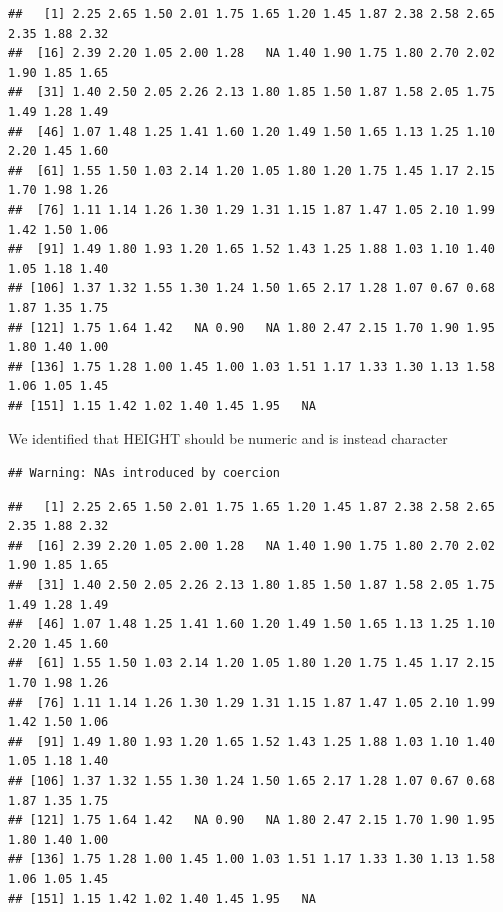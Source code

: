 \documentclass[
]{article}
\newenvironment{Shaded}{\begin{snugshade}}{\end{snugshade}}
\newcommand{\FunctionTok}[1]{\textcolor[rgb]{0.00,0.00,0.00}{#1}}
\newcommand{\NormalTok}[1]{#1}
\newcommand{\OtherTok}[1]{\textcolor[rgb]{0.56,0.35,0.01}{#1}}
\newcommand{\SpecialCharTok}[1]{\textcolor[rgb]{0.00,0.00,0.00}{#1}}
\begin{document}
\begin{verbatim}
##   [1] 2.25 2.65 1.50 2.01 1.75 1.65 1.20 1.45 1.87 2.38 2.58 2.65 2.35 1.88 2.32
##  [16] 2.39 2.20 1.05 2.00 1.28   NA 1.40 1.90 1.75 1.80 2.70 2.02 1.90 1.85 1.65
##  [31] 1.40 2.50 2.05 2.26 2.13 1.80 1.85 1.50 1.87 1.58 2.05 1.75 1.49 1.28 1.49
##  [46] 1.07 1.48 1.25 1.41 1.60 1.20 1.49 1.50 1.65 1.13 1.25 1.10 2.20 1.45 1.60
##  [61] 1.55 1.50 1.03 2.14 1.20 1.05 1.80 1.20 1.75 1.45 1.17 2.15 1.70 1.98 1.26
##  [76] 1.11 1.14 1.26 1.30 1.29 1.31 1.15 1.87 1.47 1.05 2.10 1.99 1.42 1.50 1.06
##  [91] 1.49 1.80 1.93 1.20 1.65 1.52 1.43 1.25 1.88 1.03 1.10 1.40 1.05 1.18 1.40
## [106] 1.37 1.32 1.55 1.30 1.24 1.50 1.65 2.17 1.28 1.07 0.67 0.68 1.87 1.35 1.75
## [121] 1.75 1.64 1.42   NA 0.90   NA 1.80 2.47 2.15 1.70 1.90 1.95 1.80 1.40 1.00
## [136] 1.75 1.28 1.00 1.45 1.00 1.03 1.51 1.17 1.33 1.30 1.13 1.58 1.06 1.05 1.45
## [151] 1.15 1.42 1.02 1.40 1.45 1.95   NA
\end{verbatim}

We identified that HEIGHT should be numeric and is instead character

\begin{Shaded}
\end{Shaded}

\begin{verbatim}
## Warning: NAs introduced by coercion
\end{verbatim}

\begin{Shaded}
\end{Shaded}

\begin{verbatim}
##   [1] 2.25 2.65 1.50 2.01 1.75 1.65 1.20 1.45 1.87 2.38 2.58 2.65 2.35 1.88 2.32
##  [16] 2.39 2.20 1.05 2.00 1.28   NA 1.40 1.90 1.75 1.80 2.70 2.02 1.90 1.85 1.65
##  [31] 1.40 2.50 2.05 2.26 2.13 1.80 1.85 1.50 1.87 1.58 2.05 1.75 1.49 1.28 1.49
##  [46] 1.07 1.48 1.25 1.41 1.60 1.20 1.49 1.50 1.65 1.13 1.25 1.10 2.20 1.45 1.60
##  [61] 1.55 1.50 1.03 2.14 1.20 1.05 1.80 1.20 1.75 1.45 1.17 2.15 1.70 1.98 1.26
##  [76] 1.11 1.14 1.26 1.30 1.29 1.31 1.15 1.87 1.47 1.05 2.10 1.99 1.42 1.50 1.06
##  [91] 1.49 1.80 1.93 1.20 1.65 1.52 1.43 1.25 1.88 1.03 1.10 1.40 1.05 1.18 1.40
## [106] 1.37 1.32 1.55 1.30 1.24 1.50 1.65 2.17 1.28 1.07 0.67 0.68 1.87 1.35 1.75
## [121] 1.75 1.64 1.42   NA 0.90   NA 1.80 2.47 2.15 1.70 1.90 1.95 1.80 1.40 1.00
## [136] 1.75 1.28 1.00 1.45 1.00 1.03 1.51 1.17 1.33 1.30 1.13 1.58 1.06 1.05 1.45
## [151] 1.15 1.42 1.02 1.40 1.45 1.95   NA
\end{verbatim}
\end{document}
